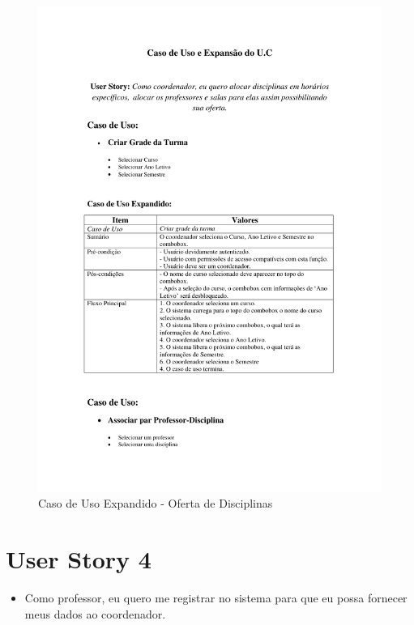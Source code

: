 \documentclass{abnt}
\begin{document}
		\begin{figure}[h]
			\begin{center}
				\includegraphics[bb=1.0in 1.0in 7.5in 10in,page=2]{ExpansaoU_C_OfertaDisciplinas.pdf}
				 \caption{Caso de Uso Expandido - Oferta de Disciplinas}
			\end{center}
		\end{figure}


		
			
	\clearpage
		\section{User Story 4}
	
			\begin{itemize}
				\item Como professor, eu quero me registrar no sistema para que eu possa fornecer meus dados ao coordenador.
			\end{itemize}
			
\end{document}
